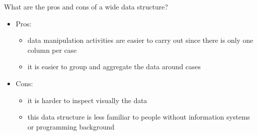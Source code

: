 \documentclass[a4paper,11pt]{book}
\newcommand{\question}[1]{%
    \begin{tcolorbox}[colback=comp_c!10,colframe=comp_c,sidebyside align=top,width=\linewidth,before skip=1ex]
        #1
    \end{tcolorbox}
    \switchcolumn%
}
\newcommand{\note}[1]{%
    \begin{tcolorbox}[colback=white!0,colframe=white!10,width=\linewidth,before skip=1ex]
        #1
    \end{tcolorbox}
}
\begin{document}
\begin{paracol}{2}
	\question{
		\raggedright What are the pros and cons of a wide data structure?
	}
	\note{
		\begin{itemize}
			\item Pros:
			\begin{itemize}
				\item data manipulation activities are easier to carry out since there is only one column per case
				\item it is easier to group and aggregate the data around cases
			\end{itemize}
			\item Cons:
			\begin{itemize}
				\item it is harder to inspect visually the data
				\item this data structure is less familiar to people without information systems or programming background
			\end{itemize}
		\end{itemize}
		}
\end{paracol}
\end{document}
